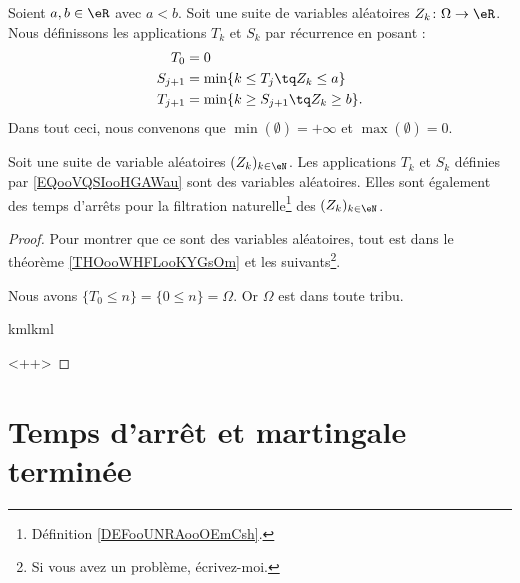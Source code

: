 \begin{definition}	\label{DEFooIUOXooPfASWz}
	Soient \( a,b\in \eR\) avec \( a<b\). Soit une suite de variables aléatoires \(Z_k \colon \Omega\to \eR  \). Nous définissons les applications \( T_k\) et \( S_k\) par récurrence en posant :
	\begin{subequations}		\label{EQooVQSIooHGAWau}
		\begin{align}
			T_0     & =0                                     \\
			S_{j+1} & =\min\{ k\leq T_j\tq Z_k\leq a \}      \\
			T_{j+1} & =\min\{ k\geq S_{j+1}\tq Z_k\geq b \}.
		\end{align}
	\end{subequations}
	Dans tout ceci, nous convenons que \( \min(\emptyset)=+\infty\) et \( \max(\emptyset)=0\).
\end{definition}

\begin{proposition}	\label{PROPooTYOAooEsoEPH}
	Soit une suite de variable aléatoires \( (Z_k)_{k\in \eN}\). Les applications \( T_k\) et \( S_k\) définies par \eqref{EQooVQSIooHGAWau} sont des variables aléatoires. Elles sont également des temps d'arrêts pour la filtration naturelle\footnote{Définition \ref{DEFooUNRAooOEmCsh}.} des \( (Z_k)_{k\in \eN}\).
\end{proposition}

\begin{proof}
	Pour montrer que ce sont des variables aléatoires, tout est dans le théorème \ref{THOooWHFLooKYGsOm} et les suivants\footnote{Si vous avez un problème, écrivez-moi.}.

	\begin{subproof}

		Nous avons \( \{ T_0\leq n \}=\{ 0\leq n \}=\Omega\). Or \( \Omega\) est dans toute tribu.


		kmlkml
	\end{subproof}<++>
\end{proof}


\section{Temps d'arrêt et martingale terminée}

